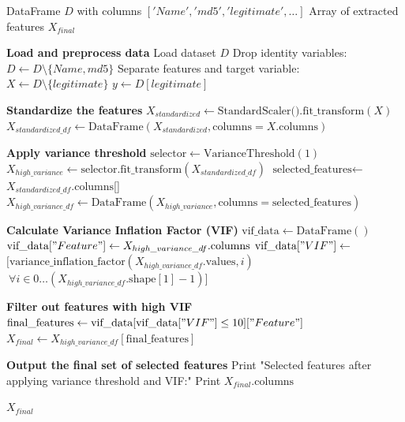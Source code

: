  \begin{algorithm}
\caption{RDset Feature Extraction using Variance Threshold and VIF}\label{alg2}
\begin{algorithmic}
    \Require DataFrame $D$ with columns $['Name', 'md5', 'legitimate', \ldots]$
    \Ensure Array of extracted features $X_{final}$
    
    \State \textbf{Load and preprocess data}
    \State Load dataset $D$
    \State Drop identity variables: $D \gets D \setminus \{Name, md5\}$
    \State Separate features and target variable:
    \State $X \gets D \setminus \{legitimate\}$
    \State $y \gets D[legitimate]$

    \State \textbf{Standardize the features}
    \State $X_{standardized} \gets \text{StandardScaler().fit\_transform}(X)$
    \State $X_{standardized\_df} \gets \text{DataFrame}(X_{standardized}, \text{columns}=X.\text{columns})$

    \State \textbf{Apply variance threshold}
    \State $\text{selector} \gets \text{VarianceThreshold}(1)$
    \State $X_{high\_variance} \gets \text{selector.fit\_transform}(X_{standardized\_df})$
    \State $\text{selected\_features} \gets$\newline
            $X_{standardized\_df}.\text{columns}$[]
    \State $X_{high\_variance\_df} \gets \text{DataFrame}(X_{high\_variance}, \text{columns}=\text{selected\_features})$

    \State \textbf{Calculate Variance Inflation Factor (VIF)}
    \State $\text{vif\_data} \gets \text{DataFrame}()$
    \State $\text{vif\_data}["Feature"] \gets X_{high\_variance\_df}.\text{columns}$
    \State $\text{vif\_data}["VIF"] \gets$ \newline
           $[\text{variance\_inflation\_factor}(X_{high\_variance\_df}.\text{values}, i)$ \newline
           $\ \forall i \in 0 \ldots (X_{high\_variance\_df}.\text{shape}[1]-1)]$

    \State \textbf{Filter out features with high VIF}
    \State $\text{final\_features} \gets \text{vif\_data}[\text{vif\_data}["VIF"] \leq 10]["Feature"]$
    \State $X_{final} \gets X_{high\_variance\_df}[\text{final\_features}]$

    \State \textbf{Output the final set of selected features}
    \State Print "Selected features after applying variance threshold and VIF:"
    \State Print $X_{final}.\text{columns}$

    \State \Return $X_{final}$
\end{algorithmic}
\end{algorithm}

